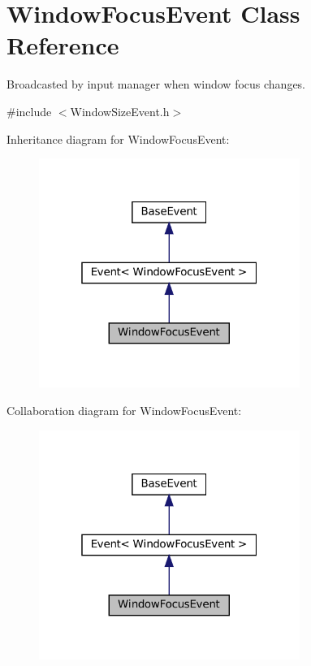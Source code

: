 \hypertarget{classWindowFocusEvent}{}\section{Window\+Focus\+Event Class Reference}
\label{classWindowFocusEvent}


Broadcasted by input manager when window focus changes.  




{\ttfamily \#include $<$Window\+Size\+Event.\+h$>$}



Inheritance diagram for Window\+Focus\+Event\+:\nopagebreak
\begin{figure}[H]
\begin{center}
\leavevmode
\includegraphics[width=241pt]{classWindowFocusEvent__inherit__graph}
\end{center}
\end{figure}


Collaboration diagram for Window\+Focus\+Event\+:\nopagebreak
\begin{figure}[H]
\begin{center}
\leavevmode
\includegraphics[width=241pt]{classWindowFocusEvent__coll__graph}
\end{center}
\end{figure}
